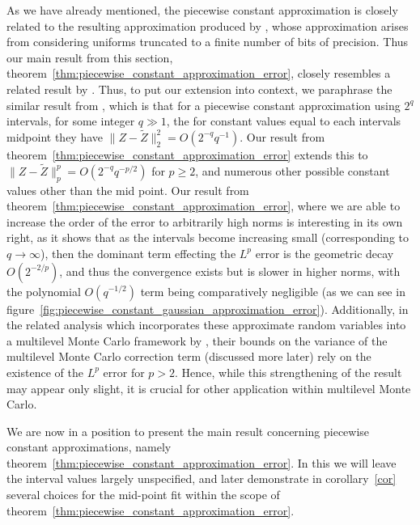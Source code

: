 \documentclass[manuscript,review]{acmart}
\begin{document}
As we have already mentioned, the piecewise constant approximation is closely related to the resulting approximation produced by \citet{giles2019random_quadrature}, whose approximation arises from considering uniforms truncated to a finite number of bits of precision. Thus our main result from this section, theorem~\ref{thm:piecewise_constant_approximation_error}, closely resembles a related result by \citet[theorem~1]{giles2019random_quadrature}. Thus, to put our extension into context, we paraphrase the similar result from \citet{giles2019random_quadrature}, which is that for a piecewise constant approximation using $ 2^q $ intervals, for some integer $ q \gg 1 $, the for constant values equal to each intervals midpoint they have $ \lVert Z - \tilde{Z}\rVert_2^2 = O(2^{-q}q^{-1}) $. Our result from theorem~\ref{thm:piecewise_constant_approximation_error} extends this to $ \lVert Z - \tilde{Z}\rVert_p^p = O(2^{-q} q^{-p/2}) $ for $ p \geq 2 $, and numerous other possible constant values other than the mid point. Our result from theorem~\ref{thm:piecewise_constant_approximation_error}, where we are able to increase the order of the error to arbitrarily high norms is interesting in its own right, as it shows that as the intervals become increasing small (corresponding to $ q \to \infty $), then the dominant term effecting the $ L^p $ error is the geometric decay $ O(2^{-2/p}) $, and thus the convergence exists but is slower in higher norms, with the polynomial $ O(q^{-1/2}) $ term being comparatively negligible (as we can see in figure~\ref{fig:piecewise_constant_gaussian_approximation_error}). Additionally, in the related analysis which incorporates these approximate random variables into a multilevel Monte Carlo framework by \citeauthor{giles2020approximate} \citep{giles2020approximate,sheridan2020nested}, their bounds on the variance of the multilevel Monte Carlo correction term (discussed more later) rely on the existence of the $ L^p $ error for $ p > 2 $. Hence, while this strengthening of the result may appear only slight, it is crucial for other application within multilevel Monte Carlo. 

We are now in a position to present the main result concerning piecewise constant approximations, namely theorem~\ref{thm:piecewise_constant_approximation_error}. In this we will leave the interval values largely unspecified, and later demonstrate in corollary~\ref{cor} several choices for the mid-point fit within the scope of theorem~\ref{thm:piecewise_constant_approximation_error}.
\end{document}
